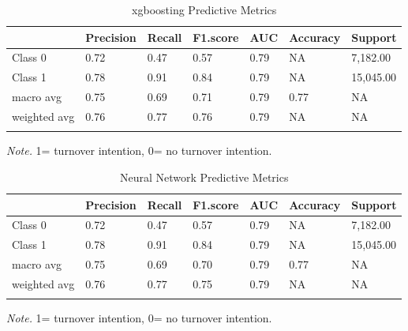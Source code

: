 \documentclass[
  man]{apa7}
\begin{document}
\begin{table}[tbp]

\begin{center}
\begin{threeparttable}

\caption{\label{tab:xgbtable40}xgboosting Predictive Metrics}

\begin{tabular}{lllllll}
\toprule
 & \multicolumn{1}{c}{Precision} & \multicolumn{1}{c}{Recall} & \multicolumn{1}{c}{F1.score} & \multicolumn{1}{c}{AUC} & \multicolumn{1}{c}{Accuracy} & \multicolumn{1}{c}{Support}\\
\midrule
Class 0 & 0.72 & 0.47 & 0.57 & 0.79 & NA & 7,182.00\\
Class 1 & 0.78 & 0.91 & 0.84 & 0.79 & NA & 15,045.00\\
macro avg & 0.75 & 0.69 & 0.71 & 0.79 & 0.77 & NA\\
weighted avg & 0.76 & 0.77 & 0.76 & 0.79 & NA & NA\\
\bottomrule
\addlinespace
\end{tabular}

\begin{tablenotes}[para]
\normalsize{\textit{Note.} 1= turnover intention, 0= no turnover intention.}
\end{tablenotes}

\end{threeparttable}
\end{center}

\end{table}

\begin{table}[tbp]

\begin{center}
\begin{threeparttable}

\caption{\label{tab:nn40}Neural Network Predictive Metrics}

\begin{tabular}{lllllll}
\toprule
 & \multicolumn{1}{c}{Precision} & \multicolumn{1}{c}{Recall} & \multicolumn{1}{c}{F1.score} & \multicolumn{1}{c}{AUC} & \multicolumn{1}{c}{Accuracy} & \multicolumn{1}{c}{Support}\\
\midrule
Class 0 & 0.72 & 0.47 & 0.57 & 0.79 & NA & 7,182.00\\
Class 1 & 0.78 & 0.91 & 0.84 & 0.79 & NA & 15,045.00\\
macro avg & 0.75 & 0.69 & 0.70 & 0.79 & 0.77 & NA\\
weighted avg & 0.76 & 0.77 & 0.75 & 0.79 & NA & NA\\
\bottomrule
\addlinespace
\end{tabular}

\begin{tablenotes}[para]
\normalsize{\textit{Note.} 1= turnover intention, 0= no turnover intention.}
\end{tablenotes}

\end{threeparttable}
\end{center}

\end{table}
\end{document}
